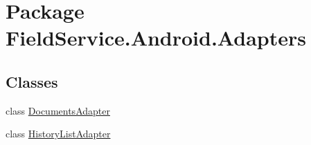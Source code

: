 \hypertarget{namespace_field_service_1_1_android_1_1_adapters}{\section{Package Field\+Service.\+Android.\+Adapters}
\label{namespace_field_service_1_1_android_1_1_adapters}
}
\subsection*{Classes}
\begin{DoxyCompactItemize}
\item 
class \hyperlink{class_field_service_1_1_android_1_1_adapters_1_1_documents_adapter}{Documents\+Adapter}
\item 
class \hyperlink{class_field_service_1_1_android_1_1_adapters_1_1_history_list_adapter}{History\+List\+Adapter}
\end{DoxyCompactItemize}
